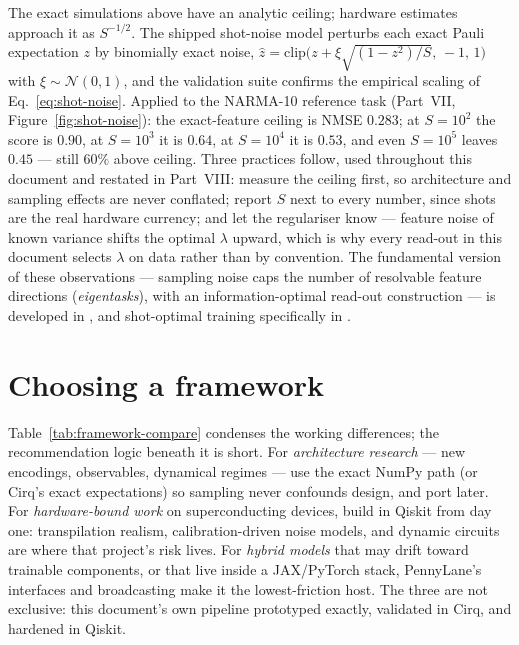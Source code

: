 The exact simulations above have an analytic ceiling; hardware estimates
approach it as $S^{-1/2}$. The shipped shot-noise model perturbs each exact
Pauli expectation $z$ by binomially exact noise,
$\hat z = \mathrm{clip}\bigl(z + \xi\sqrt{(1-z^2)/S},\,-1,\,1\bigr)$ with
$\xi\sim\mathcal N(0,1)$, and the validation suite confirms the empirical
scaling of Eq.~\eqref{eq:shot-noise}. Applied to the NARMA-10 reference task
(Part~VII, Figure~\ref{fig:shot-noise}): the exact-feature ceiling is NMSE
$0.283$; at $S=10^2$ the score is $0.90$, at $S=10^3$ it is $0.64$, at
$S=10^4$ it is $0.53$, and even $S=10^5$ leaves $0.45$ --- still $60\%$ above
ceiling. Three practices follow, used throughout this document and restated
in Part~VIII: measure the ceiling first, so architecture and sampling effects
are never conflated; report $S$ next to every number, since shots are the
real hardware currency; and let the regulariser know --- feature noise of known
variance shifts the optimal $\lambda$ upward, which is why every read-out in
this document selects $\lambda$ on data rather than by convention. The
fundamental version of these observations --- sampling noise caps the number
of resolvable feature directions (\emph{eigentasks}), with an
information-optimal read-out construction --- is developed in
\citet{hu2023tackling}, and shot-optimal training specifically in
\citet{ahmed2025optimal}.

\section{Choosing a framework}
\label{sec:framework-choice}

Table~\ref{tab:framework-compare} condenses the working differences; the
recommendation logic beneath it is short. For \emph{architecture research} ---
new encodings, observables, dynamical regimes --- use the exact NumPy path (or
Cirq's exact expectations) so sampling never confounds design, and port later.
For \emph{hardware-bound work} on superconducting devices, build in Qiskit
from day one: transpilation realism, calibration-driven noise models, and
dynamic circuits are where that project's risk lives. For \emph{hybrid
models} that may drift toward trainable components, or that live inside a
JAX/PyTorch stack, PennyLane's interfaces and broadcasting make it the
lowest-friction host. The three are not exclusive: this document's own
pipeline prototyped exactly, validated in Cirq, and hardened in Qiskit.


